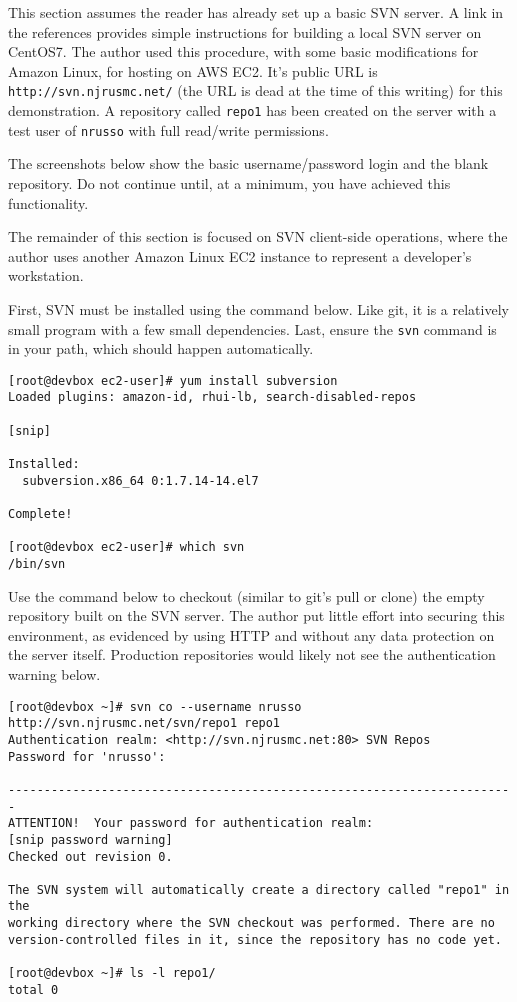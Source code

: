 This section assumes the reader has already set up a basic SVN server. A link
in the references provides simple instructions for building a local SVN server
on CentOS7. The author used this procedure, with some basic modifications for
Amazon Linux, for hosting on AWS EC2. It's public URL is
\verb|http://svn.njrusmc.net/| (the URL is dead at the time of this writing)
for this demonstration. A repository called \verb|repo1| has been created on
the server with a test user of \verb|nrusso| with full read/write permissions.

The screenshots below show the basic username/password login and the blank
repository. Do not continue until, at a minimum, you have achieved this
functionality.



The remainder of this section is focused on SVN client-side operations, where
the author uses another Amazon Linux EC2 instance to represent a developer's
workstation.

First, SVN must be installed using the command below. Like git, it is a
relatively small program with a few small dependencies. Last, ensure the
\verb|svn| command is in your path, which should happen automatically.

\begin{verbatim}
[root@devbox ec2-user]# yum install subversion
Loaded plugins: amazon-id, rhui-lb, search-disabled-repos

[snip]

Installed:
  subversion.x86_64 0:1.7.14-14.el7

Complete!

[root@devbox ec2-user]# which svn
/bin/svn
\end{verbatim}

Use the command below to checkout (similar to git's pull or clone) the empty
repository built on the SVN server. The author put little effort into securing
this environment, as evidenced by using HTTP and without any data protection
on the server itself. Production repositories would likely not see the
authentication warning below.

\begin{verbatim}
[root@devbox ~]# svn co --username nrusso http://svn.njrusmc.net/svn/repo1 repo1
Authentication realm: <http://svn.njrusmc.net:80> SVN Repos
Password for 'nrusso': 

-----------------------------------------------------------------------
ATTENTION!  Your password for authentication realm:
[snip password warning]
Checked out revision 0.

The SVN system will automatically create a directory called "repo1" in the
working directory where the SVN checkout was performed. There are no
version-controlled files in it, since the repository has no code yet.

[root@devbox ~]# ls -l repo1/
total 0
\end{verbatim}

